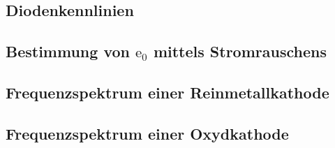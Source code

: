 	



\subsection{Diodenkennlinien}


\subsection{Bestimmung von $\text{e}_0$ mittels Stromrauschens}

\subsection{Frequenzspektrum einer Reinmetallkathode}

\subsection{Frequenzspektrum einer Oxydkathode}